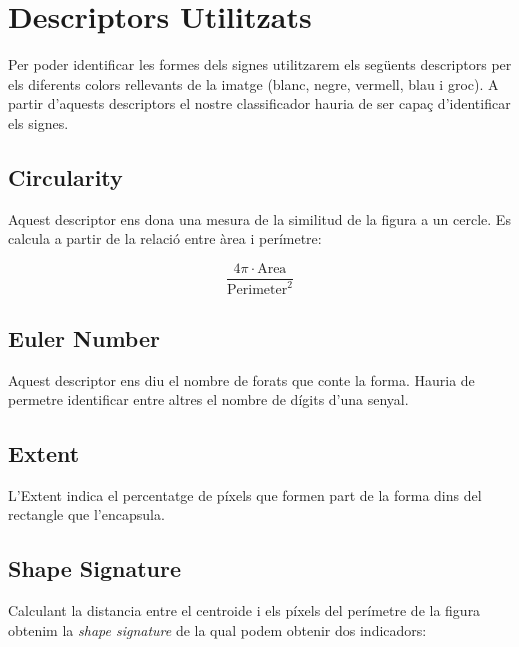 
% 



\section{Descriptors Utilitzats}%
\label{sec:desc}

Per poder identificar les formes dels signes utilitzarem els següents descriptors per els diferents
colors rellevants de la imatge (blanc, negre, vermell, blau i groc). A partir d'aquests descriptors
el nostre classificador hauria de ser capaç d'identificar els signes.

\subsection{Circularity}

Aquest descriptor ens dona una mesura de la similitud de la figura a un cercle. Es calcula a partir
de la relació entre àrea i perímetre:

\[
\frac{4\pi \cdot \text{Area}}{\text{Perimeter}^2}
\]

\subsection{Euler Number}

Aquest descriptor ens diu el nombre de forats que conte la forma. Hauria de permetre identificar entre
altres el nombre de dígits d'una senyal.

\subsection{Extent}

L'Extent indica el percentatge de píxels que formen part de la forma dins del rectangle que l'encapsula.

\subsection{Shape Signature}

Calculant la distancia entre el centroide i els píxels del perímetre de la figura obtenim la
\emph{shape signature} de la qual podem obtenir dos indicadors:

